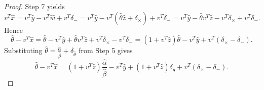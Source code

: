 \documentclass{siamltex}
\begin{document}
\begin{proof}
Step 7 yields
\[
v^T \hat x = v^T \hat y - v^T \hat w + v^T  \delta_{-} = v^T \hat y - v^T (\hat \theta \hat z + \delta_{\times}) + v^T  \delta_{-} = v^T \hat y - \hat \theta v^T \hat z - v^T \delta_{\times} + v^T  \delta_{-}.
\]
Hence
\[
\hat \theta - v^T \hat x = \hat \theta - v^T \hat y + \hat \theta v^T \hat z + v^T \delta_{\times} - v^T  \delta_{-} = (1 + v^T \hat z) \hat \theta - v^T \hat y + v^T (\delta_{\times} -  \delta_{-}). 
\]
Substituting $\hat \theta = \frac{\hat \alpha}{\hat \beta} + \delta_{\hat \theta}$ from Step 5 gives
\begin{equation}
\label{thetaZ:eq}
\hat \theta - v^T \hat x = (1 + v^T \hat z) \frac{\hat \alpha}{\hat \beta} - v^T \hat y + (1 + v^T \hat z) \delta_{\hat \theta} + v^T (\delta_{\times} -  \delta_{-}). 
\end{equation}


\end{proof}
\end{document}
